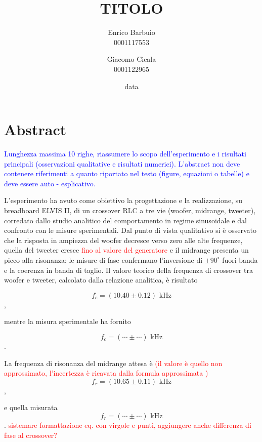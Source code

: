 \documentclass[12pt,italian]{article}
\title{TITOLO}
\author{Enrico Barbuio \\ 0001117553 \and Giacomo Cicala \\ 0001122965}
\date{data}
\newcommand{\prof}[1]{\textcolor{blue}{#1}}
\newcommand{\err}[1]{\textcolor{red}{#1}}
\begin{document}
\maketitle
\section*{Abstract}
\prof{ Lunghezza massima 10 righe, riassumere lo scopo dell'esperimento e i
  risultati principali (osservazioni qualitative e risultati numerici).
  L'abstract non deve contenere riferimenti a quanto riportato nel testo
  (figure, equazioni o tabelle) e deve essere auto - esplicativo. }

L'esperimento ha avuto come obiettivo la progettazione e la realizzazione, su
breadboard ELVIS II, di un crossover RLC a tre vie (woofer, midrange, tweeter),
corredato dallo studio analitico del comportamento in regime sinusoidale e dal
confronto con le misure sperimentali. Dal punto di vista qualitativo si è
osservato che la risposta in ampiezza del woofer decresce verso zero alle alte
frequenze, quella del tweeter cresce \err{fino al valore del generatore} e il
midrange presenta un picco alla risonanza; le misure di fase confermano
l'inversione di $ \pm 90^\circ $ fuori banda e la coerenza in banda di taglio.
Il valore teorico della frequenza di crossover tra woofer e tweeter, calcolato
dalla relazione analitica, è risultato

\begin{equation*}
  f_{c} = (10.40 \pm 0.12) \text{ kHz}
\end{equation*},

\noindent
mentre la misura sperimentale ha fornito

\begin{equation*}
  f_{c} = (\cdots \pm \cdots) \text{ kHz}
\end{equation*}.

\noindent
La frequenza di risonanza del midrange attesa è \err{(il valore è quello non approssimato, l'incertezza è ricavata dalla formula approssimata )}
\begin{equation*}
  f_{r} = (10.65 \pm 0.11) \text{ kHz}
\end{equation*},

\noindent
e quella misurata
\begin{equation*}
  f_{r} = (\cdots \pm \cdots) \text{ kHz}
\end{equation*}.
\err{sistemare formattazione eq. con virgole e punti, aggiungere anche differenza di fase al crossover?}
\end{document}
